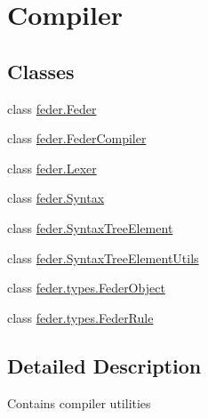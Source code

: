 \hypertarget{group__compiler}{}\section{Compiler}
\label{group__compiler}
\subsection*{Classes}
\begin{DoxyCompactItemize}
\item 
class \hyperlink{classfeder_1_1Feder}{feder.\+Feder}
\item 
class \hyperlink{classfeder_1_1FederCompiler}{feder.\+Feder\+Compiler}
\item 
class \hyperlink{classfeder_1_1Lexer}{feder.\+Lexer}
\item 
class \hyperlink{classfeder_1_1Syntax}{feder.\+Syntax}
\item 
class \hyperlink{classfeder_1_1SyntaxTreeElement}{feder.\+Syntax\+Tree\+Element}
\item 
class \hyperlink{classfeder_1_1SyntaxTreeElementUtils}{feder.\+Syntax\+Tree\+Element\+Utils}
\item 
class \hyperlink{classfeder_1_1types_1_1FederObject}{feder.\+types.\+Feder\+Object}
\item 
class \hyperlink{classfeder_1_1types_1_1FederRule}{feder.\+types.\+Feder\+Rule}
\end{DoxyCompactItemize}


\subsection{Detailed Description}
Contains compiler utilities 